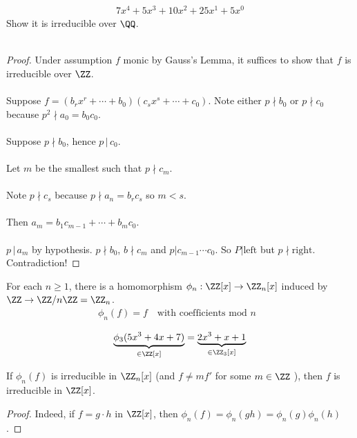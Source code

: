 \documentclass[class=scrartcl, crop=false]{standalone}
\begin{document}
\begin{example}
  \begin{gather*}
    7x^4 + 5x^3 + 10x^2 + 25x^1 + 5x^0
  \end{gather*}  Show it is irreducible over $\QQ$.
  \\\\
  \begin{proof}
    Under assumption $f$ monic by Gauss's Lemma, it suffices to show that $f$ is irreducible over $\ZZ$.
    \\\\
    Suppose $f = (b_rx^r + \cdots + b_0)(c_sx^s + \cdots + c_0)$. Note either $p \nmid b_0$ or $p \nmid c_0$ because $p^2 \nmid a_0 = b_0c_0$.
    \\\\
    Suppose $p \nmid b_0$, hence $p \, | \, c_0$.
    \\\\
    Let $m$ be the smallest such that $p \nmid c_m$.
    \\\\
    Note $p \nmid c_s$ because $p \nmid a_n = b_rc_s$ so $m < s$.
    \\\\
    Then $a_m = b_1c_{m - 1} + \cdots + b_mc_0$.
    \\\\
    $p \, | \, a_m$ by hypothesis. $p \nmid b_0$, $b \nmid c_m$ and $p | c_{m - 1} \cdots c_0$. So $P | \text{left}$ but $p \nmid \text{right}$. Contradiction!
  \end{proof} 
\end{example} 

For each $n \geq 1$, there is a homomorphism $\phi_n: \ZZ[x] \to \ZZ_n[x]$ induced by $\ZZ \to \ZZ / n\ZZ = \ZZ_n$.
\begin{gather*}
  \phi_n(f) = f \quad \text{with coefficients mod $n$ }
\end{gather*} 

\begin{example}
  \begin{gather*}
    \underbrace{\phi_3(5x^3 + 4x + 7)}_{\in \ZZ[x]} = \underbrace{2x^3 + x + 1}_{\in \ZZ_3[x]}
  \end{gather*} 
\end{example} 

\begin{lemma}
  If $\phi_n(f)$ is irreducible in $\ZZ_n[x]$ (and $f \neq mf'$ for some $m \in \ZZ$ ), then $f$ is irreducible in $\ZZ[x]$. 
  \begin{proof}
    Indeed, if $f = g \cdot h$ in $\ZZ[x]$, then $\phi_n(f) = \phi_n(gh) = \phi_n(g) \phi_n(h)$.
  \end{proof} 
\end{lemma} 
\end{document}

